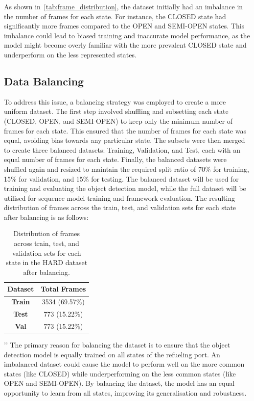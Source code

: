 \documentclass[12pt,oneside]{book} %
\begin{document}
As shown in~\ref{tab:frame_distribution}, the dataset initially had an
imbalance in the number of frames for each state. For instance, the CLOSED
state had significantly more frames compared to the OPEN and SEMI-OPEN states.
This imbalance could lead to biased training and inaccurate model performance,
as the model might become overly familiar with the more prevalent CLOSED state
and underperform on the less represented states.

\subsection{Data Balancing}
To address this issue, a balancing strategy was employed to create a more
uniform dataset. The first step involved shuffling and subsetting each state
(CLOSED, OPEN, and SEMI-OPEN) to keep only the minimum number of frames for
each state. This ensured that the number of frames for each state was equal,
avoiding bias towards any particular state. The subsets were then merged to
create three balanced datasets: Training, Validation, and Test, each with an
equal number of frames for each state. Finally, the balanced datasets were
shuffled again and resized to maintain the required split ratio of 70\% for
training, 15\% for validation, and 15\% for testing. The balanced dataset will
be used for training and evaluating the object detection model, while the full
dataset will be utilised for sequence model training and framework evaluation.
The resulting distribution of frames across the train, test, and validation
sets for each state after balancing is as follows:
\begin{table}[H]
    \centering
    \begin{tabular}{@{}cc@{}}
        \toprule
        \textbf{Dataset} & \textbf{Total Frames} \\ \midrule
        \textbf{Train}   & 3534 (69.57\%)        \\ 
        \textbf{Test}    & 773  (15.22\%)        \\ 
        \textbf{Val}     & 773  (15.22\%)        \\ \bottomrule
    \end{tabular}
    \caption{\centering Distribution of frames across train, test, and validation sets for each state in the HARD dataset after balancing.}
    \label{tab:balanced_frame_distribution}
\end{table}
’’
The primary reason for balancing the dataset is to ensure that the object
detection model is equally trained on all states of the refueling port. An
imbalanced dataset could cause the model to perform well on the more common
states (like CLOSED) while underperforming on the less common states (like OPEN
and SEMI-OPEN). By balancing the dataset, the model has an equal opportunity to
learn from all states, improving its generalisation and robustness. 
\end{document}
